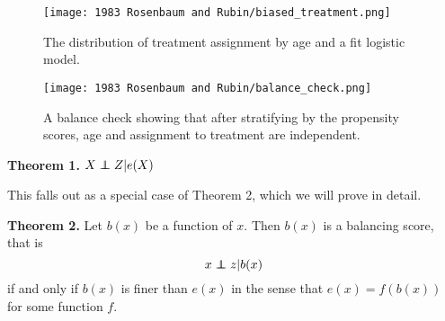 \documentclass{article}
\newcommand\independent{\protect\mathpalette{\protect\independenT}{\perp}}
\def\independenT#1#2{\mathrel{\rlap{$#1#2$}\mkern2mu{#1#2}}}
\begin{document}
\begin{figure*}
    \centering
    \texttt{[image: 1983 Rosenbaum and Rubin/biased\_treatment.png]}
    \caption{The distribution of treatment assignment by age and a fit logistic model.}
    \label{fig:treatment_and_logistic}
\end{figure*}

\begin{figure*}
    \centering
    \texttt{[image: 1983 Rosenbaum and Rubin/balance\_check.png]}
    \caption{A balance check showing that after stratifying by the propensity scores, age and assignment to treatment are independent.}
    \label{fig:balnace_check}
\end{figure*}

\newpage 
\textbf{Theorem 1.} $X \independent Z | e(X)$

This falls out as a special case of Theorem 2, which we will prove in detail.

\textbf{Theorem 2.} Let $b(x)$ be a function of $x$. Then $b(x)$ is a balancing score, that is 
$$x \independent z | b(x)$$
if and only if $b(x)$ is finer than $e(x)$ in the sense that $e(x) = f(b(x))$ for some 
function $f$. 
\end{document}

